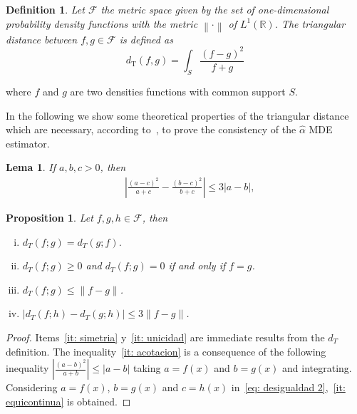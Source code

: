\documentclass[journal]{IEEEtran}
\newtheorem{definition}{Definition}
\newtheorem{proposition}{Proposition}
\numberwithin{equation}{section}
\newtheorem{lemma}{Lema}[section]
\newenvironment{dem}[1][Proof]{\begin{proof}[{\it #1}]}{\end{proof}}
\newcommand{\al}{&\,}
\newcommand{\R}{\ensuremath{\mathbb{R}}}
\newcommand{\abs}[1]{\ensuremath{\left| #1 \right|}}
\newcommand{\norm}[1]{\ensuremath{\left\| #1 \right\|}}
\newcommand{\pa}[1]{\ensuremath{\left( #1 \right)}}
\begin{document}
\vspace{0.2cm} 
\begin{definition}
	Let $\mathcal{F}$ the metric space given by the set of one-dimensional probability density functions with the metric $\norm{\cdot}$ of $L^{1}\pa{\R}$.
	The triangular distance between $f,g\in\mathcal{F}$ is defined as
	\begin{equation}
	d_{\text{T}}(f,g)=\int_{S}\frac{(f-g)^2}{f+g} 
	\label{DT}
	\end{equation}
\end{definition}
where $f$ and $g$ are two densities functions with common support $S$. 


In the following we show some theoretical properties of the triangular distance which are necessary, according to~\cite{parr1982}, to prove the consistency of the $\widehat{\alpha}$ MDE estimator.

\vspace{0.2cm}
\begin{lemma}
	If $a,b,c>0$, then
	\begin{subequations}
		\begin{align}
		\label{eq: desigualdad 2}
		\al \abs{\frac{\pa{a-c}^{2}}{a+c} - \frac{\pa{b-c}^{2}}{b+c}} \le 3 \abs{a-b},
		\end{align}
	\end{subequations}
\end{lemma}

\vspace{0.2cm}

\begin{proposition}
	Let $f,g,h\in\mathcal{F}$, then
	\begin{enumerate}[i.]
		\item\label{it: simetria} $d_{T}\pa{f;g} = d_{T}\pa{g;f}$.
		\item\label{it: unicidad} $d_{T}\pa{f;g} \ge 0$ and $d_{T}\pa{f;g} = 0$ if and only if $f = g$.
		\item\label{it: acotacion} $d_{T}\pa{f;g} \le \norm{f-g}$.
		\item\label{it: equicontinua} $\abs{d_{T}\pa{f;h}-d_{T}\pa{g;h}} \le 3 \norm{f-g}$.
	\end{enumerate}
\end{proposition}

\vspace{0.2cm}

\begin{dem}
	Items~\eqref{it: simetria} y~\eqref{it: unicidad} are immediate results from the $d_{T}$ definition.
	The inequality~\eqref{it: acotacion} is a consequence of the following inequality $\abs{\frac{\pa{a-b}^{2}}{a+b}} \le \abs{a-b}$ taking $a = f\pa{x}$ and $b = g\pa{x}$ and integrating.
	Considering $a = f\pa{x}$, $b = g\pa{x}$ and $c = h\pa{x}$ in~\eqref{eq: desigualdad 2},~\eqref{it: equicontinua} is obtained.
\end{dem}
\end{document}
